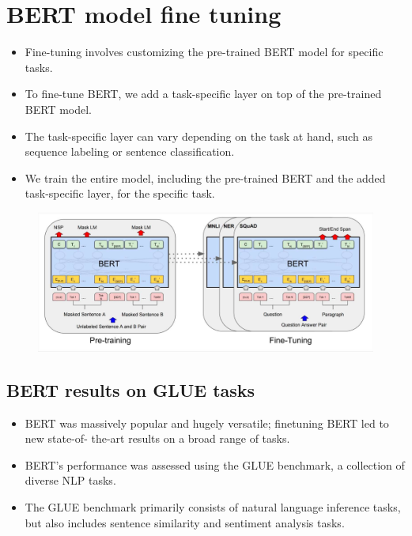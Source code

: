 \section{BERT model fine tuning}
\begin{itemize}
\item Fine-tuning involves customizing the pre-trained BERT model for specific tasks.
\item To fine-tune BERT, we add a task-specific layer on top of the pre-trained BERT model.
\item The task-specific layer can vary depending on the task at hand, such as sequence labeling or sentence classification.
\item We train the entire model, including the pre-trained BERT and the added task-specific layer, for the specific task.
\end{itemize}

 \begin{figure}[h]
        	\includegraphics[scale = 0.2]{pics/BERTFineTuning.png}
        \end{figure}  



\subsection{BERT results on GLUE tasks}
\begin{itemize}
 \item BERT was massively popular and hugely versatile; finetuning BERT led to new state-of-
the-art results on a broad range of tasks.
\item BERT's performance was assessed using the GLUE benchmark, a collection of diverse NLP tasks.
\item The GLUE benchmark primarily consists of natural language inference tasks, but also includes sentence similarity and sentiment analysis tasks.
\end{itemize}

